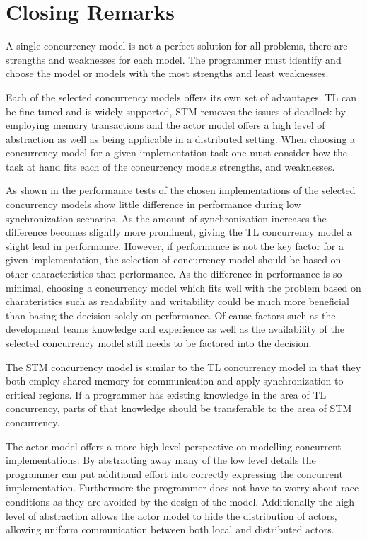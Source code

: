 \section{Closing Remarks}\label{sec:choose_closing}
A single concurrency model is not a perfect solution for all problems, there are strengths and weaknesses for each model. The programmer must identify and choose the model or models with the most strengths and least weaknesses. 

Each of the selected concurrency models offers its own set of advantages. \ac{TL} can be fine tuned and is widely supported, \ac{STM} removes the issues of deadlock by employing memory transactions and the actor model offers a high level of abstraction as well as being applicable in a distributed setting. When choosing a concurrency model for a given implementation task one must consider how the task at hand fits each of the concurrency models strengths, and weaknesses.

As shown in the performance tests of  the chosen implementations of the selected concurrency models show little difference in performance during low synchronization scenarios. As the amount of synchronization increases the difference becomes slightly more prominent, giving the \ac{TL} concurrency model a slight lead in performance. However, if performance is not the key factor for a given implementation, the selection of concurrency model should be based on other characteristics than performance. As the difference in performance is so minimal, choosing a concurrency model which fits well with the problem based on charateristics such as readability and writability could be much more beneficial than basing the decision solely on performance. Of cause factors such as the development teams knowledge and experience as well as the availability of the selected concurrency model still needs to be factored into the decision.

The \ac{STM} concurrency model is similar to the \ac{TL} concurrency model in that they both employ shared memory for communication and apply synchronization to critical regions. If a programmer has existing knowledge in the area of \ac{TL} concurrency, parts of that knowledge should be transferable to the area of \ac{STM} concurrency.

The actor model offers a more high level perspective on modelling concurrent implementations. By abstracting away many of the low level details the programmer can put additional effort into correctly expressing the concurrent implementation. Furthermore the programmer does not have to worry about race conditions as they are avoided by the design of the model. Additionally the high level of abstraction allows the actor model to hide the distribution of actors, allowing uniform communication between both local and distributed actors.


\worksheetend